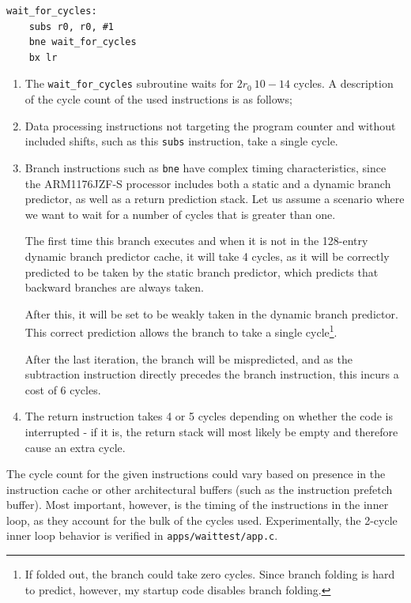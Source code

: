 \documentclass[twoside]{uva-inf-bachelor-thesis}
\newcommand{\code}[1]{\lstinline[breaklines=true]{#1}}
\begin{document}
\begin{lstlisting}
wait_for_cycles:
    subs r0, r0, #1
    bne wait_for_cycles
    bx lr
\end{lstlisting}


\begin{enumerate}
    \item The \code{wait_for_cycles} subroutine waits for $2r_0 ~10-14$ cycles. A description of the cycle count of the used instructions is as follows;
    \item Data processing instructions not targeting the program counter and without included shifts, such as this \code{subs} instruction, take a single cycle\cite[p. 16-7]{arm:arm1176}.
    \item Branch instructions such as \code{bne} have complex timing characteristics, since the ARM1176JZF-S processor includes both a static and a dynamic branch predictor, as well as a return prediction stack\cite[p. 16-2]{arm:arm1176}. Let us assume a scenario where we want to wait for a number of cycles that is greater than one.

    The first time this branch executes and when it is not in the 128-entry dynamic branch predictor cache, it will take 4 cycles, as it will be correctly predicted to be taken by the static branch predictor, which predicts that backward branches are always taken\cite[p. 5-5]{arm:arm1176}.

    After this, it will be set to be weakly taken in the dynamic branch predictor. This correct prediction allows the branch to take a single cycle\footnote{If folded out, the branch could take zero cycles. Since branch folding is hard to predict, however, my startup code disables branch folding.}\cite{arm:arm1176}.

    After the last iteration, the branch will be mispredicted, and as the subtraction instruction directly precedes the branch instruction, this incurs a cost of 6 cycles.
    \item The return instruction takes 4 or 5 cycles depending on whether the code is interrupted - if it is, the return stack will most likely be empty and therefore cause an extra cycle.
\end{enumerate}

The cycle count for the given instructions could vary based on presence in the instruction cache or other architectural buffers (such as the instruction prefetch buffer). Most important, however, is the timing of the instructions in the inner loop, as they account for the bulk of the cycles used. Experimentally, the 2-cycle inner loop behavior is verified in \code{apps/waittest/app.c}.
\end{document}

